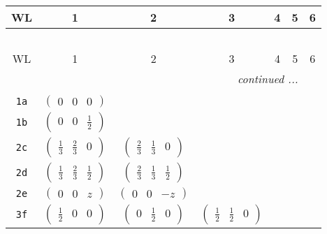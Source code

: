\documentclass[fleqn,9pt,landscape]{jsarticle}
\begin{document}
\begin{center}
\renewcommand{\arraystretch}{1.2}
\begin{longtable}{ccccccc}
 \hline \hline
WL & 1 & 2 & 3 & 4 & 5 & 6 \\ \hline \endfirsthead

\multicolumn{6}{l}{\tablename\ \thetable{}} \\
 \hline \hline
WL & 1 & 2 & 3 & 4 & 5 & 6 \\ \hline \endhead

 \hline \hline
\multicolumn{6}{r}{\footnotesize\it continued ...} \\ \endfoot

 \hline \hline
\multicolumn{6}{r}{} \\ \endlastfoot

{\tt 1a} & $ \begin{pmatrix} 0 & 0 & 0 \end{pmatrix} $ & $  $ & $  $ & $  $ & $  $ & $  $ \\ \hline
{\tt 1b} & $ \begin{pmatrix} 0 & 0 & \frac{1}{2} \end{pmatrix} $ & $  $ & $  $ & $  $ & $  $ & $  $ \\ \hline
{\tt 2c} & $ \begin{pmatrix} \frac{1}{3} & \frac{2}{3} & 0 \end{pmatrix} $ & $ \begin{pmatrix} \frac{2}{3} & \frac{1}{3} & 0 \end{pmatrix} $ & $  $ & $  $ & $  $ & $  $ \\ \hline
{\tt 2d} & $ \begin{pmatrix} \frac{1}{3} & \frac{2}{3} & \frac{1}{2} \end{pmatrix} $ & $ \begin{pmatrix} \frac{2}{3} & \frac{1}{3} & \frac{1}{2} \end{pmatrix} $ & $  $ & $  $ & $  $ & $  $ \\ \hline
{\tt 2e} & $ \begin{pmatrix} 0 & 0 & z \end{pmatrix} $ & $ \begin{pmatrix} 0 & 0 & - z \end{pmatrix} $ & $  $ & $  $ & $  $ & $  $ \\ \hline
{\tt 3f} & $ \begin{pmatrix} \frac{1}{2} & 0 & 0 \end{pmatrix} $ & $ \begin{pmatrix} 0 & \frac{1}{2} & 0 \end{pmatrix} $ & $ \begin{pmatrix} \frac{1}{2} & \frac{1}{2} & 0 \end{pmatrix} $ & $  $ & $  $ & $  $ \\ \hline

\end{longtable}
\end{center}
\end{document}
